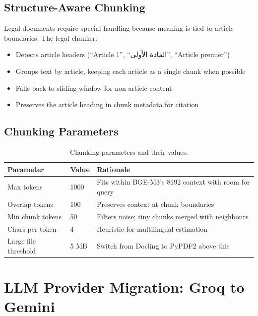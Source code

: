 \documentclass[12pt, a4paper]{article}
\begin{document}
\subsection{Structure-Aware Chunking}

Legal documents require special handling because meaning is tied to article
boundaries. The legal chunker:
\begin{itemize}[leftmargin=2em]
  \item Detects article headers (``Article 1'', ``المادة الأولى'',
        ``Article premier'')
  \item Groups text by article, keeping each article as a single chunk
        when possible
  \item Falls back to sliding-window for non-article content
  \item Preserves the article heading in chunk metadata for citation
\end{itemize}

\subsection{Chunking Parameters}

\begin{table}[H]
\centering
\caption{Chunking parameters and their values.}
\small
\begin{tabularx}{\textwidth}{l C{3cm} X}
\toprule
{}\color{white}\textbf{Parameter} & \color{white}\textbf{Value} & \color{white}\textbf{Rationale} \\
\midrule
Max tokens & 1000 & Fits within BGE-M3's 8192 context with room for query \\
Overlap tokens & 100 & Preserves context at chunk boundaries \\
Min chunk tokens & 50 & Filters noise; tiny chunks merged with neighbours \\
Chars per token & 4 & Heuristic for multilingual estimation \\
Large file threshold & 5 MB & Switch from Docling to PyPDF2 above this \\
\bottomrule
\end{tabularx}
\end{table}


\section{LLM Provider Migration: Groq to Gemini}
\label{sec:migration}
\end{document}

